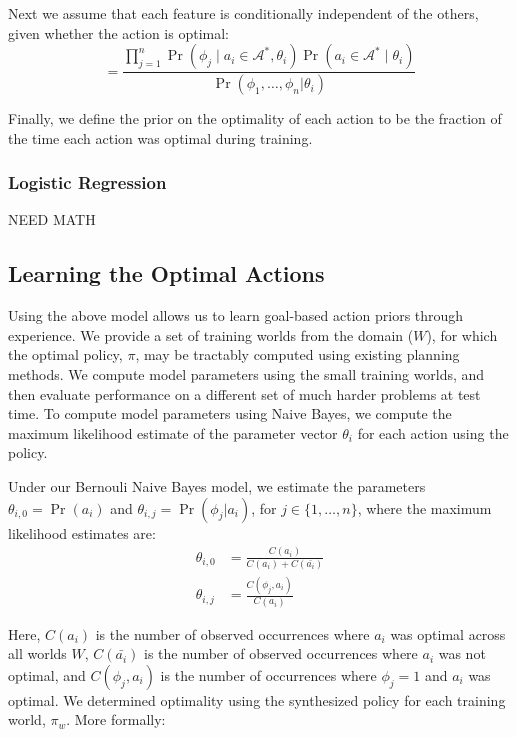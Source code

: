 \documentclass[11pt]{article}
\begin{document}
Next we assume that each feature is conditionally independent of the others, given whether the action is optimal:
\begin{equation}
= \frac{\prod_{j=1}^{n} \Pr(\phi_j \mid a_i \in \mathcal{A}^*, \theta_i) \Pr(a_i \in \mathcal{A}^* \mid \theta_i) }{\Pr(\phi_1, \ldots, \phi_{n} | \theta_i)}
\label{eq:final}
\end{equation}

Finally, we define the prior on the optimality of each action to be
the fraction of the time each action was optimal during training.


\subsubsection{Logistic Regression}

NEED MATH


\subsection{Learning the Optimal Actions}
Using the above model allows us to learn goal-based action priors
through experience. We provide a set of
training worlds from the domain ($W$), for which the optimal policy,
$\pi$, may be tractably computed using existing planning methods.  We
compute model parameters using the small training worlds, and then
evaluate performance on a different set of much harder problems at
test time.  To compute model parameters using Naive Bayes, we compute
the maximum likelihood estimate of the parameter vector $\theta_i$ for
each action using the policy.

Under our Bernouli Naive Bayes model, we estimate the parameters
$\theta_{i,0} = \Pr(a_i)$ and $\theta_{i,j} = \Pr(\phi_j | a_i)$, for $j \in \{1, \ldots, n \}$, where the maximum likelihood estimates are:
\begin{align}
\theta_{i,0} &= \frac{C(a_i)}{C(a_i) + C(\bar{a_i})} \\
\theta_{i,j} &= \frac{C(\phi_j, a_i)}{C(a_i)}
\end{align}

Here, $C(a_i)$ is the number of observed occurrences where $a_i$ was optimal across all worlds $W$,
$C(\bar{a_i})$ is the number of observed occurrences where $a_i$ was not optimal,
and $C(\phi_j, a_i)$ is the number of occurrences where $\phi_j=1$ and $a_i$ was optimal.
We determined optimality using the synthesized policy for each training world, $\pi_w$. More formally:
\end{document}
